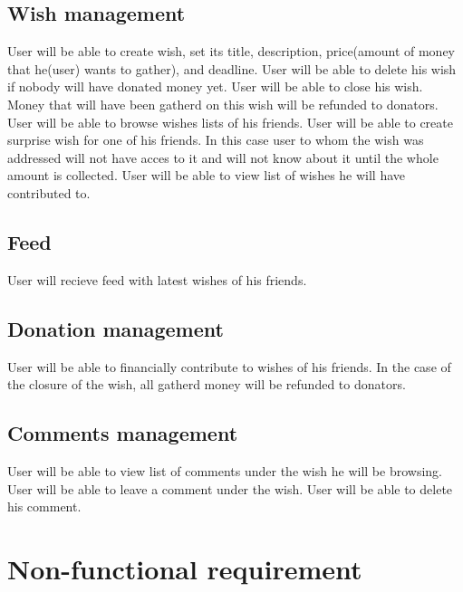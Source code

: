 \subsection{Wish management}
User will be able to create wish, set its title, description, price(amount of money that he(user) wants to gather),
and deadline.
User will be able to delete his wish if nobody will have donated money yet.
User will be able to close his wish. Money that will have been gatherd on this wish will be refunded to donators.
User will be able to browse wishes lists of his friends.
User will be able to create surprise wish for one of his friends. In this case user to whom the wish was addressed
will not have acces to it and will not know about it until the whole amount is collected.
User will be able to view list of wishes he will have contributed to.

\subsection{Feed}
User will recieve feed with latest wishes of his friends.

\subsection{Donation management}
User will be able to financially contribute to wishes of his friends.
In the case of the closure of the wish, all gatherd money will be refunded to donators.

\subsection{Comments management}
User will be able to view list of comments under the wish he will be browsing.
User will be able to leave a comment under the wish.
User will be able to delete his comment.

\section{Non-functional requirement}

